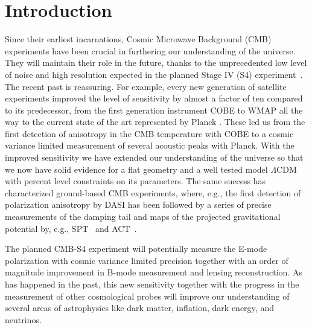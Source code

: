 \documentclass[aps,prd,reprint,superscriptaddress]{revtex4-1}
\begin{document}
\section{Introduction}\label{sec:intro}
Since their earliest incarnations, Cosmic Microwave Background (CMB) experiments have been crucial in furthering our understanding of the universe. They will maintain their role in the future, thanks to the unprecedented low level of noise and high resolution expected in the planned Stage IV (S4) experiment~\cite{2013arXiv1309.5383A}.
The recent past is  reassuring. For example, every new generation of satellite experiments improved the level of sensitivity by almost a factor of ten compared to its predecessor, from the first generation instrument COBE to WMAP all the way to the current state of the art represented by Planck \cite{2015arXiv150201589P, planck-collaboration:2014, 2003ApJS..148..175S, 2000ApJ...545L...5H,2000Natur.404..955D}. 
These led us from the first detection of anisotropy in the CMB temperature with COBE to a cosmic variance limited measurement of several acoustic peaks with Planck. With the improved sensitivity we have extended our understanding of the universe so that we now have solid evidence for a flat geometry and a well tested model $\Lambda$CDM with percent level constraints on its parameters.
The same success has characterized ground-based CMB experiments, where, e.g., the first detection of polarization anisotropy by DASI \cite{2002ApJ...568...38H} has been followed by a series of precise measurements of the damping tail and maps of the projected gravitational potential by, e.g., SPT~\cite{2011ApJ...743...28K} and ACT~\cite{2011ApJ...739...52D}.

The planned CMB-S4 experiment will potentially measure the E-mode polarization with cosmic variance limited precision together with an order of magnitude improvement in B-mode measurement and lensing reconstruction. As has happened in the past, this new sensitivity together with the progress in the measurement of other cosmological probes will improve our understanding of several areas of astrophysics like dark matter, inflation, dark energy, and neutrinos. 
\end{document}
